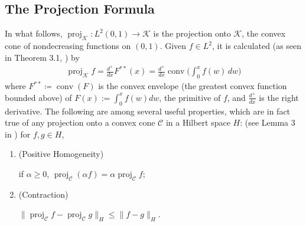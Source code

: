 \documentclass[10pt,a4paper]{amsart}
\numberwithin{equation}{section}
\DeclareMathOperator{\proj}{proj}
\DeclareMathOperator{\conv}{conv}
\begin{document}
\subsection{The Projection Formula}\label{projection-section}
    In what follows, $\proj_{\mathcal K}:L^2(0,1)\to \mathcal{K}$ is the projection onto $\mathcal{K}$, the convex cone of nondecreasing functions on $(0,1)$. Given $f\in L^2$, it is calculated (as seen in Theorem 3.1, \cite{Natile-Savare}) by 
    \begin{align}\label{projection-computation}
        \proj_\mathcal{K}f=\frac{d^+}{dx}F^{**}(x)=\frac{d^+}{dx}\conv\Big(\int_0^x f(w) \, dw\Big)
    \end{align}
    where $F^{**}\coloneq\conv(F)$ is the convex envelope (the greatest convex function bounded above) of $F(x):=\int_0^x f(w)dw$, the primitive of $f$, and $\frac{d^+}{dx}$ is the right derivative. The following are among several useful properties, which are in fact true of any projection onto a convex cone $\mathcal{C}$ in a Hilbert space $H$: (see Lemma 3 in \cite{Ingram-Marsh}) for $f,g\in H$, 
    \begin{enumerate}[label=\textup{(\roman*)}]
        \item \hypertarget{PositiveHomogeneity}{\textup{(Positive Homogeneity)}} if $\alpha\geq0$, $\proj_\mathcal{C}(\alpha f)=\alpha\proj_\mathcal{C}f$;
        \item \hypertarget{Contraction}{\textup{(Contraction)}} $\|\proj_\mathcal{C}f-\proj_\mathcal{C}g\|_H\leq\|f-g\|_H$.
    \end{enumerate}
    
\end{document}
